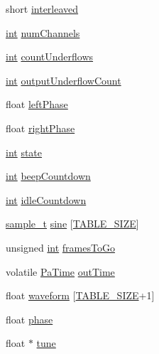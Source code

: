 \begin{DoxyCompactItemize}
short \hyperlink{structpa_test_data_aa077ebccde623a61f4753142819882ed}{interleaved}
\item 
\hyperlink{xmltok_8h_a5a0d4a5641ce434f1d23533f2b2e6653}{int} \hyperlink{structpa_test_data_a13e83fe2a80bd86874185c2db2bcd2f6}{num\+Channels}
\item 
\hyperlink{xmltok_8h_a5a0d4a5641ce434f1d23533f2b2e6653}{int} \hyperlink{structpa_test_data_aa878bdf823ef3eb32c03880579f41296}{count\+Underflows}
\item 
\hyperlink{xmltok_8h_a5a0d4a5641ce434f1d23533f2b2e6653}{int} \hyperlink{structpa_test_data_acd16baa4873f67dd413628a2f45bdfa1}{output\+Underflow\+Count}
\item 
float \hyperlink{structpa_test_data_a791399a61d1c91f168215407fc8f2ec1}{left\+Phase}
\item 
float \hyperlink{structpa_test_data_afbc8dc6c4de93721d9049b62988da99a}{right\+Phase}
\item 
\hyperlink{xmltok_8h_a5a0d4a5641ce434f1d23533f2b2e6653}{int} \hyperlink{structpa_test_data_a5221f25e1bd2fa7a57da76ceb805e1a4}{state}
\item 
\hyperlink{xmltok_8h_a5a0d4a5641ce434f1d23533f2b2e6653}{int} \hyperlink{structpa_test_data_aadec0c5a3befe150e2ea1279fd52d36b}{beep\+Countdown}
\item 
\hyperlink{xmltok_8h_a5a0d4a5641ce434f1d23533f2b2e6653}{int} \hyperlink{structpa_test_data_a177b3cb30e100d85f39780e93c97a62b}{idle\+Countdown}
\item 
\hyperlink{soxr_8c_aeef50d4abead1cb3eef063fda4b721c0}{sample\+\_\+t} \hyperlink{structpa_test_data_a89b2ad9469d771a4bf45ee8954ccdf2b}{sine} \mbox{[}\hyperlink{sine_8cxx_ada4ebb227211f96616c9e6681a944bc1}{T\+A\+B\+L\+E\+\_\+\+S\+I\+ZE}\mbox{]}
\item 
unsigned \hyperlink{xmltok_8h_a5a0d4a5641ce434f1d23533f2b2e6653}{int} \hyperlink{structpa_test_data_ab9c9ad798396a89553cd709aedfdf169}{frames\+To\+Go}
\item 
volatile \hyperlink{portaudio_8h_af17a7e6d0471a23071acf8dbd7bbe4bd}{Pa\+Time} \hyperlink{structpa_test_data_a9e3239a2d641d8cea8c0a24a2cb01207}{out\+Time}
\item 
float \hyperlink{structpa_test_data_a6b32b75de182bd051bde0b48c7532ee7}{waveform} \mbox{[}\hyperlink{sine_8cxx_ada4ebb227211f96616c9e6681a944bc1}{T\+A\+B\+L\+E\+\_\+\+S\+I\+ZE}+1\mbox{]}
\item 
float \hyperlink{structpa_test_data_a9a42e4b78f3d1dab0ce1f1e51f656cd3}{phase}
\item 
float $\ast$ \hyperlink{structpa_test_data_a3881ecb8fcbb56ec522c9d8451feda9a}{tune}

\end{DoxyCompactItemize}
